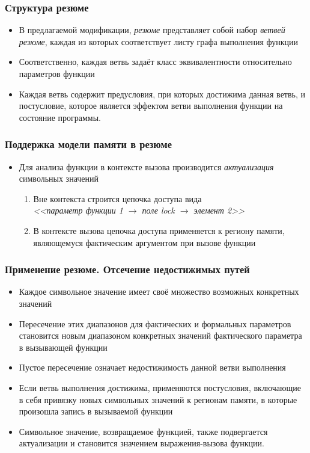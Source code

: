 \documentclass[14pt]{beamer}
\begin{document}
\begin{frame}
\frametitle{Структура резюме}
\begin{itemize}
  \item В предлагаемой модификации, \textit{резюме} представляет собой набор \textit{ветвей резюме}, каждая из которых соответствует листу графа выполнения функции
  \item Соответственно, каждая ветвь задаёт класс эквивалентности относительно параметров функции
  \item Каждая ветвь содержит предусловия, при которых достижима данная ветвь, и постусловие, которое является эффектом ветви выполнения функции на состояние программы.
\end{itemize}
\end{frame}

\begin{frame}
\frametitle{Поддержка модели памяти в резюме}
\begin{itemize}
  \item Для анализа функции в контексте вызова производится \textit{актуализация} символьных значений
  \begin{enumerate}
    \item Вне контекста строится цепочка доступа вида \\ \textit{<<параметр функции 1 $\rightarrow$ поле lock $\rightarrow$ элемент 2>>}
    \item В контексте вызова цепочка доступа применяется к региону памяти, являющемуся фактическим аргументом при вызове функции
  \end{enumerate}
\end{itemize}
\end{frame}

\begin{frame}[allowframebreaks]
\frametitle{Применение резюме. Отсечение недостижимых путей}
\begin{itemize}
  \item Каждое символьное значение имеет своё множество возможных конкретных значений
  \item Пересечение этих диапазонов для фактических и формальных параметров становится новым диапазоном конкретных значений фактического параметра в вызывающей функции
  \item Пустое пересечение означает недостижимость данной ветви выполнения
  \item Если ветвь выполнения достижима, применяются постусловия, включающие в себя привязку новых символьных значений к регионам памяти, в которые произошла запись в вызываемой функции
  \item Символьное значение, возвращаемое функцией, также подвергается актуализации и становится значением выражения-вызова функции.
\end{itemize}
\end{frame}
\end{document}
